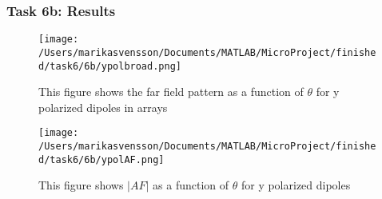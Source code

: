 \begin{frame}
\frametitle{Task 6b: Results}
\begin{figure}[h]
\centering
\texttt{[image: /Users/marikasvensson/Documents/MATLAB/MicroProject/finished/task6/6b/ypolbroad.png]}
\caption{This figure shows the far field pattern as a function of $\theta$ for y polarized dipoles in arrays}
\label{task6b:ypol}
\end{figure}
\end{frame}


\begin{frame}
\begin{figure}[h]
\centering
\texttt{[image: /Users/marikasvensson/Documents/MATLAB/MicroProject/finished/task6/6b/ypolAF.png]}
\caption{This figure shows $|AF|$ as a function of $\theta$ for y polarized dipoles}
\label{task6b:ypolAF}
\end{figure}
\end{frame}


